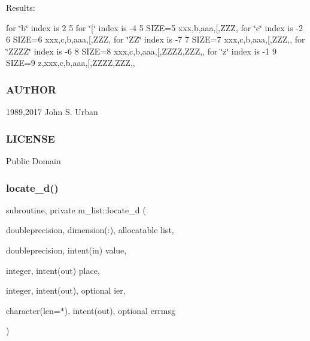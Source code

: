 Results\+:

for \char`\"{}b\char`\"{} index is 2 5 for \char`\"{}\mbox{[}\char`\"{} index is -\/4 5 S\+I\+ZE=5 xxx,b,aaa,\mbox{[},Z\+ZZ, for \char`\"{}c\char`\"{} index is -\/2 6 S\+I\+ZE=6 xxx,c,b,aaa,\mbox{[},Z\+ZZ, for \char`\"{}\+Z\+Z\char`\"{} index is -\/7 7 S\+I\+ZE=7 xxx,c,b,aaa,\mbox{[},Z\+ZZ,, for \char`\"{}\+Z\+Z\+Z\+Z\char`\"{} index is -\/6 8 S\+I\+ZE=8 xxx,c,b,aaa,\mbox{[},Z\+Z\+ZZ,Z\+ZZ,, for \char`\"{}z\char`\"{} index is -\/1 9 S\+I\+ZE=9 z,xxx,c,b,aaa,\mbox{[},Z\+Z\+ZZ,Z\+ZZ,,

\subsubsection*{A\+U\+T\+H\+OR}

1989,2017 John S. Urban \subsubsection*{L\+I\+C\+E\+N\+SE}

Public Domain \mbox{\label{namespacem__list_a6b746f0ad79a6fbfbafcf0ee22e38891}} 
\subsubsection{\texorpdfstring{locate\+\_\+d()}{locate\_d()}}
{\footnotesize\ttfamily subroutine, private m\+\_\+list\+::locate\+\_\+d (\begin{DoxyParamCaption}\item[{doubleprecision, dimension(\+:), allocatable}]{list,  }\item[{doubleprecision, intent(in)}]{value,  }\item[{integer, intent(out)}]{place,  }\item[{integer, intent(out), optional}]{ier,  }\item[{character(len=$\ast$), intent(out), optional}]{errmsg }\end{DoxyParamCaption})\hspace{0.3cm}{\ttfamily [private]}}

\mbox{\label{namespacem__list_a5b1b93df5003d6dce72acba89e779638}} 
